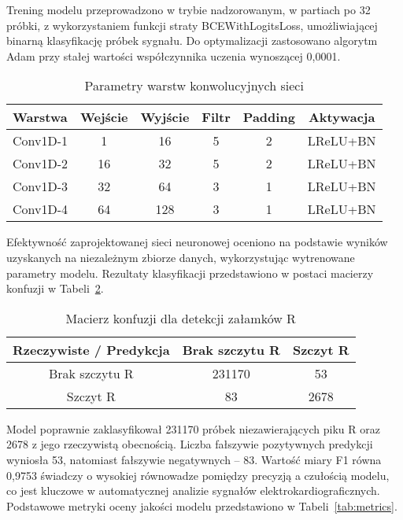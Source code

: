 \documentclass[journal]{IEEEtran}
\begin{document}
Trening modelu przeprowadzono w trybie nadzorowanym, w partiach po 32 próbki, z wykorzystaniem funkcji straty BCEWithLogitsLoss, umożliwiającej binarną klasyfikację próbek sygnału. Do optymalizacji zastosowano algorytm Adam przy stałej wartości współczynnika uczenia wynoszącej 0,0001.

\begin{table}[h!]
\centering
\caption{Parametry warstw konwolucyjnych sieci}
\label{tab:conv_layers}
\begin{tabular}{|l|c|c|c|c|c|}
\hline
\textbf{Warstwa} & \textbf{Wejście} & \textbf{Wyjście} & \textbf{Filtr} & \textbf{Padding} & \textbf{Aktywacja} \\
\hline
Conv1D-1 & 1   & 16  & 5 & 2 & LReLU+BN \\
Conv1D-2 & 16  & 32  & 5 & 2 & LReLU+BN \\
Conv1D-3 & 32  & 64  & 3 & 1 & LReLU+BN \\
Conv1D-4 & 64  & 128 & 3 & 1 & LReLU+BN \\
\hline
\end{tabular}
\end{table}

Efektywność zaprojektowanej sieci neuronowej oceniono na podstawie wyników uzyskanych na niezależnym zbiorze danych, wykorzystując wytrenowane parametry modelu. Rezultaty klasyfikacji przedstawiono w postaci macierzy konfuzji w Tabeli~\ref{tab:conf_matrix}.

\begin{table}[ht]
\centering
\caption{Macierz konfuzji dla detekcji załamków R}
\label{tab:conf_matrix}
\begin{tabular}{|c|c|c|}
\hline
\textbf{Rzeczywiste / Predykcja} & \textbf{Brak szczytu R} & \textbf{Szczyt R} \\
\hline
Brak szczytu R & 231170 & 53 \\
\hline
Szczyt R & 83 & 2678 \\
\hline
\end{tabular}
\end{table}

\newpage
Model poprawnie zaklasyfikował 231170 próbek niezawierających piku R oraz 2678 z jego rzeczywistą obecnością. Liczba fałszywie pozytywnych predykcji wyniosła 53, natomiast fałszywie negatywnych -- 83. Wartość miary F1 równa 0,9753 świadczy o wysokiej równowadze pomiędzy precyzją a czułością modelu, co jest kluczowe w automatycznej analizie sygnałów elektrokardiograficznych. Podstawowe metryki oceny jakości modelu przedstawiono w Tabeli~\ref{tab:metrics}.
\end{document}
